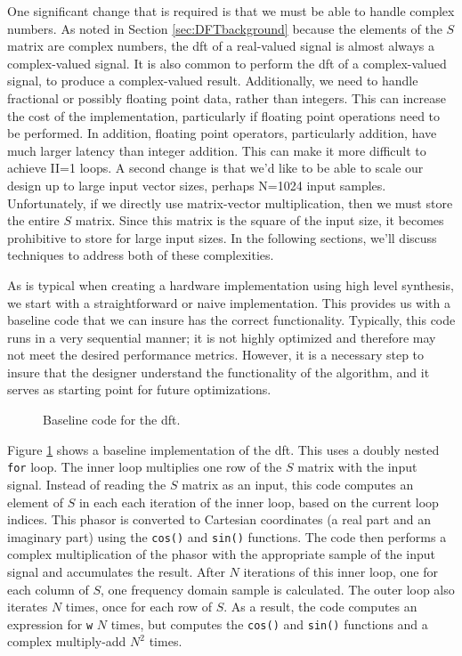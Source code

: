 One significant change that is required is that we must be able to handle complex numbers.  As noted in Section \ref{sec:DFTbackground} because the elements of the $S$ matrix are complex numbers, the \gls{dft} of a real-valued signal is almost always a complex-valued signal.   It is also common to perform the \gls{dft} of a complex-valued signal, to produce a complex-valued result.  Additionally, we need to handle fractional or possibly floating point data, rather than integers.  This can increase the cost of the implementation, particularly if floating point operations need to be performed.  In addition, floating point operators, particularly addition, have much larger latency than integer addition.  This can make it more difficult to achieve II=1 loops.  A second change is that we'd like to be able to scale our design up to large input vector sizes, perhaps N=1024 input samples.  Unfortunately, if we directly use matrix-vector multiplication, then we must store the entire $S$ matrix.  Since this matrix is the square of the input size, it becomes prohibitive to store for large input sizes.  In the following sections, we'll discuss techniques to address both of these complexities. 

As is typical when creating a hardware implementation using high level synthesis, we start with a straightforward or naive implementation. This provides us with a baseline code that we can insure has the correct functionality. Typically, this code runs in a very sequential manner; it is not highly optimized and therefore may not meet the desired performance metrics. However, it is a necessary step to insure that the designer understand the functionality of the algorithm, and it serves as starting point for future optimizations.

\begin{figure}

\caption{Baseline code for the \gls{dft}.}
\label{fig:dft_code}
\end{figure}

Figure \ref{fig:dft_code} shows a baseline implementation of the \gls{dft}. This uses a doubly nested \lstinline|for| loop. The inner loop multiplies one row of the $S$ matrix with the input signal. Instead of reading the $S$ matrix as an input, this code computes an element of $S$ in each each iteration of the inner loop, based on the current loop indices.  This phasor is converted to Cartesian coordinates (a real part and an imaginary part) using the \lstinline|cos()| and \lstinline|sin()| functions. The code then performs a complex multiplication of the phasor with the appropriate sample of the input signal and accumulates the result. After $N$ iterations of this inner loop, one for each column of $S$, one frequency domain sample is calculated. The outer loop also iterates $N$ times, once for each row of $S$.  As a result, the code computes an expression for \lstinline|w| $N$ times, but computes the \lstinline|cos()| and \lstinline|sin()| functions and a complex multiply-add $N^2$ times.

